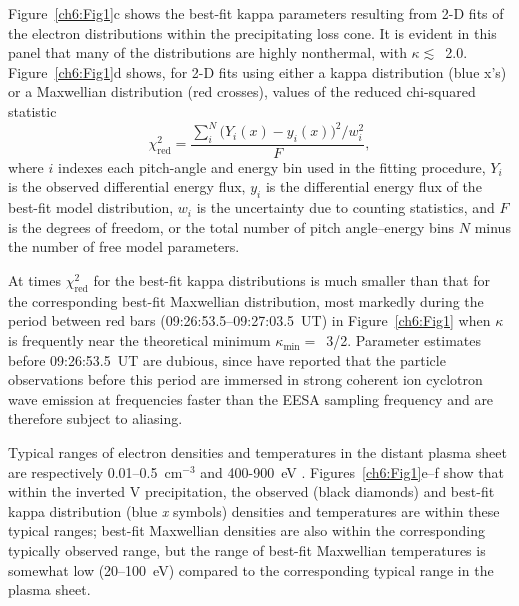   Figure~\ref{ch6:Fig1}c shows the best-fit kappa parameters resulting from 2-D
  fits of the electron distributions within the precipitating loss cone. It is
  evident in this panel that many of the distributions are highly nonthermal,
  with $\kappa \lesssim$~2.0. Figure~\ref{ch6:Fig1}d shows, for 2-D fits using
  either a kappa distribution (blue x's) or a Maxwellian distribution (red
  crosses), values of the reduced chi-squared statistic
  \begin{equation} \label{ch6:eqchi2} \chi_{\mathrm{red}}^2 = \frac{\sum\limits_i^N \Big
      ( Y_i(x) - y_i(x) \Big )^2 / w_i^2}{F},
  \end{equation}
  where $i$ indexes each pitch-angle and energy bin used in the fitting
  procedure, $Y_i$ is the observed differential energy flux, $y_i$ is the
  differential energy flux of the best-fit model distribution, $w_i$ is the
  uncertainty due to counting statistics, and $F$ is the degrees of freedom, or
  the total number of pitch angle--energy bins $N$ minus the number of free
  model parameters.

  At times $\chi^2_{\textrm{red}}$ for the best-fit kappa distributions is much
  smaller than that for the corresponding best-fit Maxwellian distribution, most
  markedly during the period between red bars (09:26:53.5--09:27:03.5~UT) in
  Figure~\ref{ch6:Fig1} when $\kappa$ is frequently near the theoretical minimum
  $\kappa_{\mathrm{min}} =$~3/2.  Parameter estimates before 09:26:53.5~UT are
  dubious, since \citet{Chaston2002b} have reported that the particle
  observations before this period are immersed in strong coherent ion cyclotron
  wave emission at frequencies faster than the EESA sampling frequency and are
  therefore subject to aliasing.

  Typical ranges of electron densities and temperatures in the distant plasma
  sheet are respectively 0.01--0.5~cm$^{-3}$ and 400-900~eV
  \citep{Kletzing2003,Paschmann2003}. Figures~\ref{ch6:Fig1}e--f show that
  within the inverted V precipitation, the observed (black diamonds) and
  best-fit kappa distribution (blue \emph{x} symbols) densities and temperatures
  are within these typical ranges; best-fit Maxwellian densities are also within
  the corresponding typically observed range, but the range of best-fit
  Maxwellian temperatures is somewhat low (20--100~eV) compared to the
  corresponding typical range in the plasma sheet.


